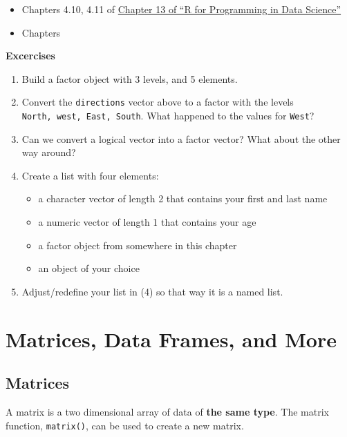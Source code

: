 \documentclass[
]{book}
\providecommand{\tightlist}{%
  \setlength{\itemsep}{0pt}\setlength{\parskip}{0pt}}
\begin{document}
\begin{itemize}
\tightlist
\item
  Chapters 4.10, 4.11 of \href{https://bookdown.org/rdpeng/rprogdatascience/}{Chapter 13 of ``R for Programming in Data Science''}
\item
  Chapters
\end{itemize}

\textbf{Excercises}

\begin{enumerate}
\def\labelenumi{\arabic{enumi})}
\item
  Build a factor object with 3 levels, and 5 elements.
\item
  Convert the \texttt{directions} vector above to a factor with the levels \texttt{North,\ west,\ East,\ South}. What happened to the values for \texttt{West}?
\item
  Can we convert a logical vector into a factor vector? What about the other way around?
\item
  Create a list with four elements:

  \begin{itemize}
  \item
    a character vector of length 2 that contains your first and last name
  \item
    a numeric vector of length 1 that contains your age
  \item
    a factor object from somewhere in this chapter
  \item
    an object of your choice
  \end{itemize}
\item
  Adjust/redefine your list in (4) so that way it is a named list.
\end{enumerate}

\hypertarget{matrices-data-frames-and-more}{%
\chapter{Matrices, Data Frames, and More}\label{matrices-data-frames-and-more}}

\hypertarget{matrices}{%
\section{Matrices}\label{matrices}}

A matrix is a two dimensional array of data of \textbf{the same type}. The matrix function, \texttt{matrix()}, can be used to create a new matrix.
\end{document}
